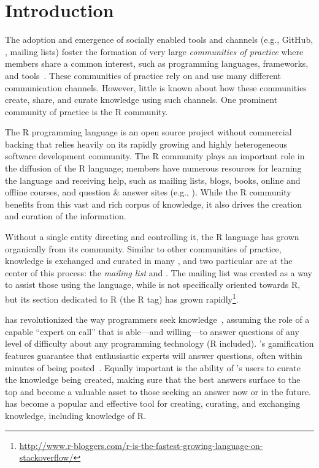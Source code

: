 \section{Introduction}
\label{cha:introduction}
The adoption and emergence of socially enabled tools and channels (e.g., GitHub, \SO, mailing lists) foster the formation of very large \textit{communities of practice} where members share a common interest, such as programming languages, frameworks, and tools~\cite{Storey2014}. These communities of practice rely on and use many different communication channels. However, little is known about how these communities create, share, and curate knowledge using such channels. One prominent community of practice is the R community.

The R programming language is an open source project without commercial backing that relies heavily on its rapidly growing and highly heterogeneous software development community. The R community plays an important role in the diffusion of the R language; members have numerous resources for learning the language and receiving help, such as mailing lists, blogs, books, online and offline courses, and question \& answer sites (e.g., \SO). While the R community benefits from this vast and rich corpus of knowledge, it also drives the creation and curation of the information.

Without a single entity directing and controlling it, the R language has grown organically from its community. Similar to other communities of practice, knowledge is exchanged and curated in many \channels, and two particular \channels are at the center of this process: the \textit{\RH mailing list} and \textit{\SO}. The \RH mailing list was created as a way to assist those using the language, while \SO is not specifically oriented towards R, but its section dedicated to R (the R tag) has grown rapidly\footnote{\href{http://www.r-bloggers.com/r-is-the-fastest-growing-language-on-stackoverflow/}{http://www.r-bloggers.com/r-is-the-fastest-growing-language-on-stackoverflow/}}.

\SO has revolutionized the way programmers seek knowledge~\cite{li2013help,Vasilescu2014c}, assuming the role of a capable ``expert on call'' that is able---and willing---to answer questions of any level of difficulty about any programming technology (R included). \SO's gamification features guarantee that enthusiastic experts will answer questions, often within minutes of being posted~\cite{Mamykina2011}. Equally important is the ability of \SO's users to curate the knowledge being created, making sure that the best answers surface to the top and become a valuable asset to those seeking an answer now or in the future. \SO has become a popular and effective tool for creating, curating, and exchanging knowledge, including knowledge of R.

